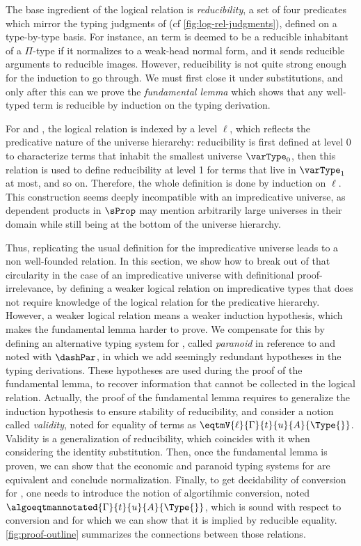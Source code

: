 The base ingredient of the logical relation is \emph{reducibility}, a set
of four predicates which mirror the typing judgments of \SetoidCC 
(cf \cref{fig:log-rel-judgments}), defined on a type-by-type basis.
% 
For instance, an term is deemed to be a reducible inhabitant of a \( \Pi \)-type 
if it normalizes to a weak-head normal form, and it sends reducible 
arguments to reducible images.
% 
However, reducibility is not quite strong enough for the induction to go 
through. We must first close it under substitutions, and only after this
can we prove the \emph{fundamental lemma} which shows that any well-typed 
term is reducible by induction on the typing derivation.

For \MLTT and \SetoidCC, the logical relation is indexed by a level
\( \ell \), which reflects the predicative nature of the universe
hierarchy: reducibility is first defined at level $0$ to characterize
terms that inhabit the smallest universe \( \varType_0 \), then this relation is used
to define reducibility at level 1 for terms that live in
\( \varType_1 \) at most, and so on. Therefore, the whole definition is
done by induction on \( \ell \).
%
This construction seems deeply incompatible with an impredicative
universe, as dependent products in \( \sProp \) may mention arbitrarily
large universes in their domain while still being at the bottom
of the universe hierarchy.

Thus, replicating the usual definition for the impredicative universe
leads to a non well-founded relation.
%
In this section, we show how to break out of that circularity in the case of an
impredicative universe with definitional proof-irrelevance, by
defining a weaker logical relation on impredicative types that does
not require knowledge of the logical relation for the predicative
hierarchy.
%
However, a weaker logical relation means a weaker induction hypothesis,
which makes the fundamental lemma harder to prove.
We compensate for this by defining an alternative typing system
for \SetoidCC, called \emph{paranoid} in reference to
 and noted with $\dashPar$,
in which we add seemingly redundant hypotheses in the typing derivations.
These hypotheses are used during the proof of the fundamental lemma, to
recover information that cannot be collected in the logical relation.
%
Actually, the proof of the fundamental lemma requires to generalize
the induction hypothesis to ensure stability of reducibility, and
consider a notion called \emph{validity}, noted for equality of terms as
$\eqtmV{\ell}{\Gamma}{t}{u}{A}{\Type{}}$.
%
Validity is a generalization of reducibility, which coincides with it
when considering the identity substitution.
%
Then, once the fundamental lemma is proven, we can show that the
economic and paranoid typing systems for \SetoidCC are equivalent and
conclude normalization.
%
Finally, to get decidability of conversion for
\SetoidCC, one needs to introduce the notion of algortihmic
conversion, noted $\algoeqtmannotated{\Gamma}{t}{u}{A}{\Type{}}$,
which is sound with respect to conversion and for which we can
show that it is implied by reducible equality.
%
\cref{fig:proof-outline} summarizes the connections between those relations.

